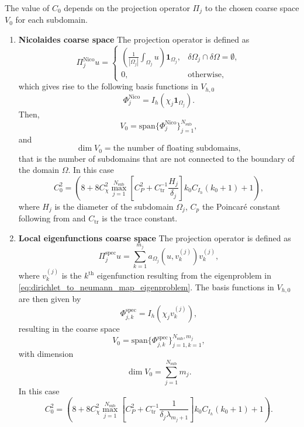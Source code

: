 The value of $C_0$ depends on the projection operator $\Pi_j$ to the chosen coarse space $V_0$ for each subdomain.
\begin{enumerate}[label=\Roman*., ref=ASM coarse space \Roman*]
    \item\label{ASM_coarse_space:nicolaides} \textbf{Nicolaides coarse space} The projection operator is defined as
    \begin{equation}
        \Pi_j^{\text{Nico}}u = \begin{cases}
            (\frac{1}{|\Omega_j|}\int_{\Omega_j} u)\mathbf{1}_{\Omega_j}, & \delta\Omega_j \cap \delta \Omega = \emptyset, \\
            0, & \text{otherwise},
        \end{cases}
        \label{eq:nicolaides_coarse_space_projection}
    \end{equation}
    which gives rise to the following basis functions in $V_{h,0}$
    \[
        \Phi^{\text{Nico}}_j = I_h(\chi_j \mathbf{1}_{\Omega_j}).
    \]
    Then,
    \[
        V_0 = \text{span}\{\Phi^{\text{Nico}}_j\}_{j=1}^{N_{\text{sub}}},
    \]
    and
    \[
        \dim V_0 = \text{the number of floating subdomains},
    \]
    that is the number of subdomains that are not connected to the boundary of the domain $\Omega$. In this case \cite[Theorem 5.16]{schwarz_methods_Dolean_2015}
    \begin{equation}
        C_0^{2} = \left(8 + 8 C_{\chi}^2 \max_{j=1}^{N_{\text{sub}}}\left[C_P^2 + C^{-1}_{\text{tr}}\frac{H_j}{\delta_j}\right]k_0 C_{I_h}(k_0 + 1) + 1\right),
        \label{eq:c0_nicolaides}
    \end{equation}
    where $H_j$ is the diameter of the subdomain $\Omega_j$, $C_p$ the Poincaré constant following from \cite[Lemma 5.18]{schwarz_methods_Dolean_2015} and $C_{\text{tr}}$ is the trace constant.
    \item\label{ASM_coarse_space:local_eigenfunctions} \textbf{Local eigenfunctions coarse space} The projection operator is defined as
    \[
        \Pi_j^{\text{spec}}u = \sum_{k=1}^{m_j} a_{\Omega_j}(u, v^{(j)}_k) v^{(j)}_k,
    \]
    where $v^{(j)}_k$ is the $k^{\text{th}}$ eigenfunction resulting from the eigenproblem in \cref{eq:dirichlet_to_neumann_map_eigenproblem}. The basis functions in $V_{h,0}$ are then given by
    \[
        \Phi^{\text{spec}}_{j,k} = I_h(\chi_j v^{(j)}_k),
    \]
    resulting in the coarse space
    \[
        V_0 = \text{span}\{\Phi^{\text{spec}}_{j,k}\}_{j=1,k=1}^{N_{\text{sub}},m_j},
    \]
    with dimension
    \[
        \dim V_0 = \sum_{j=1}^{N_{\text{sub}}} m_j.
    \]
    In this case \cite[Theorem 5.17]{schwarz_methods_Dolean_2015}
    \begin{equation}
        C_0^{2} = \left(8 + 8 C_{\chi}^2 \max_{j=1}^{N_{\text{sub}}}\left[C_P^2 + C^{-1}_{\text{tr}}\frac{1}{\delta_j\lambda_{m_j +1}}\right]k_0 C_{I_h}(k_0 + 1) + 1\right).
      \label{eq:c0_local_eigenfunctions}
    \end{equation}
\end{enumerate}